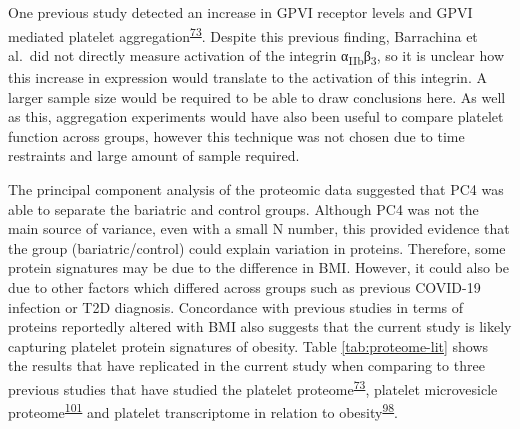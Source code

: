 \documentclass[11pt,twoside]{bristolthesis}
\begin{document}
One previous study detected an increase in GPVI receptor levels and GPVI mediated platelet aggregation\textsuperscript{\protect\hyperlink{ref-Barrachina2019}{73}}. Despite this previous finding, Barrachina et al.~did not directly measure activation of the integrin α\textsubscript{IIb}β\textsubscript{3}, so it is unclear how this increase in expression would translate to the activation of this integrin. A larger sample size would be required to be able to draw conclusions here. As well as this, aggregation experiments would have also been useful to compare platelet function across groups, however this technique was not chosen due to time restraints and large amount of sample required.

The principal component analysis of the proteomic data suggested that PC4 was able to separate the bariatric and control groups. Although PC4 was not the main source of variance, even with a small N number, this provided evidence that the group (bariatric/control) could explain variation in proteins. Therefore, some protein signatures may be due to the difference in BMI. However, it could also be due to other factors which differed across groups such as previous COVID-19 infection or T2D diagnosis. Concordance with previous studies in terms of proteins reportedly altered with BMI also suggests that the current study is likely capturing platelet protein signatures of obesity. Table \ref{tab:proteome-lit} shows the results that have replicated in the current study when comparing to three previous studies that have studied the platelet proteome\textsuperscript{\protect\hyperlink{ref-Barrachina2019}{73}}, platelet microvesicle proteome\textsuperscript{\protect\hyperlink{ref-Grande2019}{101}} and platelet transcriptome in relation to obesity\textsuperscript{\protect\hyperlink{ref-Freedman2010}{98}}.
\end{document}
